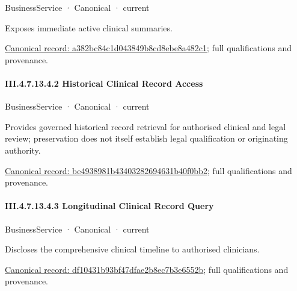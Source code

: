 \label{element:a382bc84c1d043849b8cd8ebe8a482c1}
{\small BusinessService · Canonical · current}\par

Exposes immediate active clinical summaries.


{\footnotesize \href{../../../../../../../continuum/business/business-service/a382bc84c1d043849b8cd8ebe8a482c1.md}{Canonical record: a382bc84c1d043849b8cd8ebe8a482c1}; full qualifications and provenance.}\par
\paragraph*{III.4.7.13.4.2 Historical Clinical Record Access}
\label{navigation:III.4.7.13.4.2}

\label{element:be4938981b43403282694631b40f0bb2}
{\small BusinessService · Canonical · current}\par

Provides governed historical record retrieval for authorised clinical and legal review; preservation does not itself establish legal qualification or originating authority.


{\footnotesize \href{../../../../../../../continuum/business/business-service/be4938981b43403282694631b40f0bb2.md}{Canonical record: be4938981b43403282694631b40f0bb2}; full qualifications and provenance.}\par
\paragraph*{III.4.7.13.4.3 Longitudinal Clinical Record Query}
\label{navigation:III.4.7.13.4.3}

\label{element:df10431b93bf47dfae2b8ec7b3e6552b}
{\small BusinessService · Canonical · current}\par

Discloses the comprehensive clinical timeline to authorised clinicians.


{\footnotesize \href{../../../../../../../continuum/business/business-service/df10431b93bf47dfae2b8ec7b3e6552b.md}{Canonical record: df10431b93bf47dfae2b8ec7b3e6552b}; full qualifications and provenance.}\par
